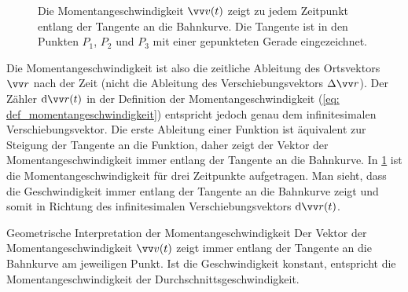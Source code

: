 \begin{figure}
    \caption{Die Momentangeschwindigkeit $\protect\ivec{v}(t)$ zeigt zu jedem Zeitpunkt entlang der Tangente an die Bahnkurve. Die Tangente ist in den Punkten $P_1$, $P_2$ und $P_3$ mit einer gepunkteten Gerade eingezeichnet.}\label{fig: momentangeschwindigkeit_tangente}
\end{figure}
Die Momentangeschwindigkeit ist also die zeitliche Ableitung des Ortsvektors $\ivec{r}$ nach der Zeit (nicht die Ableitung des Verschiebungsvektors $\Delta \ivec{r}$). Der Zähler $\dd \ivec{r}(t)$ in der Definition der Momentangeschwindigkeit (\cref{eq: def_momentangeschwindigkeit}) entspricht jedoch genau dem infinitesimalen Verschiebungsvektor. 
Die erste Ableitung einer Funktion ist äquivalent zur Steigung der Tangente an die Funktion, daher zeigt der Vektor der Momentangeschwindigkeit immer entlang der Tangente an die Bahnkurve. In \cref{fig: momentangeschwindigkeit_tangente} ist die Momentangeschwindigkeit für drei Zeitpunkte aufgetragen. Man sieht, dass die Geschwindigkeit immer entlang der Tangente an die Bahnkurve zeigt und somit in Richtung des infinitesimalen Verschiebungsvektors $\dd \ivec{r}(t)$.

\begin{rememberbox}[]{Geometrische Interpretation der Momentangeschwindigkeit}
    Der Vektor der Momentangeschwindigkeit $\ivec{v}(t)$ zeigt immer entlang der Tangente an die Bahnkurve am jeweiligen Punkt. Ist die Geschwindigkeit konstant, entspricht die Momentangeschwindigkeit der Durchschnittsgeschwindigkeit.
\end{rememberbox}

